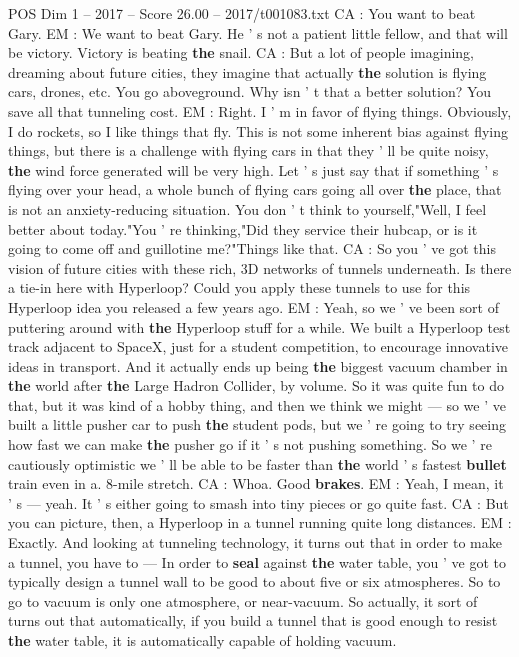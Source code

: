 \begin{textsample}{POS Dim 1 – 2017 – Score 26.00 – 2017/t001083.txt}
CA : You want to beat Gary.
EM : We want to beat Gary.
He ' s not a patient little fellow, and that will be victory.
Victory is beating \textbf{the} snail.
CA : But a lot of people imagining, dreaming about future cities, they imagine that actually \textbf{the} solution is flying cars, drones, etc.
You go aboveground.
Why isn ' t that a better solution?
You save all that tunneling cost.
EM : Right.
I ' m in favor of flying things.
Obviously, I do rockets, so I like things that fly.
This is not some inherent bias against flying things, but there is a challenge with flying cars in that they ' ll be quite noisy, \textbf{the} wind force generated will be very high.
Let ' s just say that if something ' s flying over your head, a whole bunch of flying cars going all over \textbf{the} place, that is not an anxiety-reducing situation.
You don ' t think to yourself,"Well, I feel better about today."You ' re thinking,"Did they service their hubcap, or is it going to come off and guillotine me?"Things like that.
CA : So you ' ve got this vision of future cities with these rich, 3D networks of tunnels underneath.
Is there a tie-in here with Hyperloop?
Could you apply these tunnels to use for this Hyperloop idea you released a few years ago.
EM : Yeah, so we ' ve been sort of puttering around with \textbf{the} Hyperloop stuff for a while.
We built a Hyperloop test track adjacent to SpaceX, just for a student competition, to encourage innovative ideas in transport.
And it actually ends up being \textbf{the} biggest vacuum chamber in \textbf{the} world after \textbf{the} Large Hadron Collider, by volume.
So it was quite fun to do that, but it was kind of a hobby thing, and then we think we might — so we ' ve built a little pusher car to push \textbf{the} student pods, but we ' re going to try seeing how fast we can make \textbf{the} pusher go if it ' s not pushing something.
So we ' re cautiously optimistic we ' ll be able to be faster than \textbf{the} world ' s fastest \textbf{bullet} train even in a. 8-mile stretch.
CA : Whoa.
Good \textbf{brakes}.
EM : Yeah, I mean, it ' s — yeah.
It ' s either going to smash into tiny pieces or go quite fast.
CA : But you can picture, then, a Hyperloop in a tunnel running quite long distances.
EM : Exactly.
And looking at tunneling technology, it turns out that in order to make a tunnel, you have to — In order to \textbf{seal} against \textbf{the} water table, you ' ve got to typically design a tunnel wall to be good to about five or six atmospheres.
So to go to vacuum is only one atmosphere, or near-vacuum.
So actually, it sort of turns out that automatically, if you build a tunnel that is good enough to resist \textbf{the} water table, it is automatically capable of holding vacuum.

\end{textsample}
